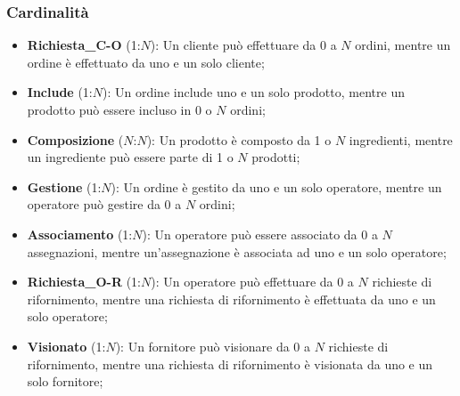 \documentclass[12pt,a4paper]{article}
\begin{document}
    \subsubsection{Cardinalità}
    \begin{itemize}[leftmargin=1em]
        \item \textbf{Richiesta\_C-O} (1:\(N\)): Un cliente può effettuare da 0 a \(N\) ordini, mentre un ordine è effettuato da uno e un solo cliente;
        \item \textbf{Include} (1:\(N\)): Un ordine include uno e un solo prodotto, mentre un prodotto può essere incluso in 0 o \(N\) ordini;
        \item \textbf{Composizione} (\(N\):\(N\)): Un prodotto è composto da 1 o \(N\) ingredienti, mentre un ingrediente può essere parte di 1 o \(N\) prodotti;
        \item \textbf{Gestione} (1:\(N\)): Un ordine è gestito da uno e un solo operatore, mentre un operatore può gestire da 0 a \(N\) ordini;
        \item \textbf{Associamento} (1:\(N\)): Un operatore può essere associato da 0 a \(N\) assegnazioni, mentre un'assegnazione è associata ad uno e un solo operatore;
        \item \textbf{Richiesta\_O-R} (1:\(N\)): Un operatore può effettuare da 0 a \(N\) richieste di rifornimento, mentre una richiesta di rifornimento è effettuata da uno e un solo operatore;
        \item \textbf{Visionato} (1:\(N\)): Un fornitore può visionare da 0 a \(N\) richieste di rifornimento, mentre una richiesta di rifornimento è visionata da uno e un solo fornitore;
    \end{itemize}
\end{document}
